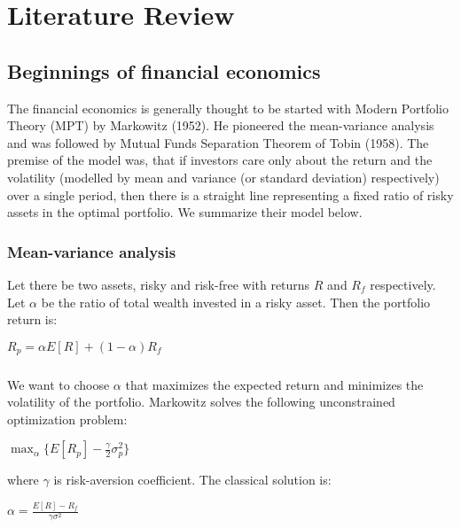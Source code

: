 \chapter{Literature Review}
\label{litreview}

\section{Beginnings of financial economics}

The financial economics is generally thought to be started with Modern Portfolio Theory (MPT) by Markowitz (1952). He pioneered the mean-variance analysis and was followed by Mutual Funds Separation Theorem of Tobin (1958). The premise of the model was, that if investors care only about the return and the volatility (modelled by mean and variance (or standard deviation) respectively) over a single period, then there is a straight line representing a fixed ratio of risky assets in the optimal portfolio. We summarize their model below.

\subsection{Mean-variance analysis}
Let there be two assets, risky and risk-free with returns $R$ and $R_f$ respectively. Let $\alpha$ be the ratio of total wealth invested in a risky asset. Then the portfolio return is:

\begin{center}
  $R_p = \alpha E[R] + (1-\alpha) R_f$
\end{center}

\paragraph{}We want to choose $\alpha$ that maximizes the expected return and minimizes the volatility of the portfolio. Markowitz solves the following unconstrained optimization problem:

\begin{center}
  $\displaystyle\max_{\alpha} \{ E[R_p] - \frac{\gamma}{2}\sigma^2_p \}$
\end{center}

where $\gamma$ is risk-aversion coefficient. The classical solution is:

\begin{center}
	$\alpha = \frac{E[R] - R_f}{\gamma\sigma^2}$
\end{center}

